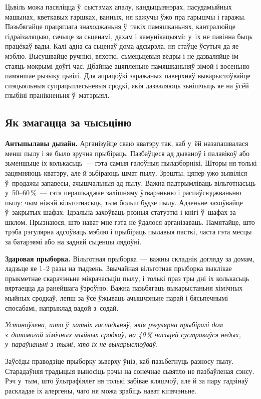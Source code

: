 Цьвіль можа пасяліцца ў~сыстэмах апалу, кандыцыянэрах, пасудамыйных машынах, кветкавых гаршках, ванных, ня кажучы ўжо пра гарышчы і гаражы. Пазьбягайце працяглага знаходжаньня ў~такіх памяшканьнях, кантралюйце гідраізаляцыю, сачыце за сьценамі, дахам і камунікацыямі: у~іх не павінна быць працёкаў вады. Калі адна са сьценаў дома адсырэла, ня стаўце ўсутыч да яе мэблю. Высушвайце ручнікі, вяхоткі, сьмецьцевыя вёдры і не дазваляйце ім стаяць мокрымі доўгі час. Дбайнае ацяпленьне памяшканьняў зімой і восеньню памяншае рызыку цьвілі. Для апрацоўкі заражаных паверхняў выкарыстоўвайце спэцыяльныя супрацьплесьневыя сродкі, якія дазваляюць зьнішчыць яе на ўсёй глыбіні пранікненьня ў~матэрыял.

\subsection*{Як змагацца за чысьціню}

\textbf{Антыпылавы дызайн.} Арганізуйце сваю кватэру так, каб у~ёй назапашвалася менш пылу і яе было зручна прыбіраць. Пазбаўцеся ад дываноў і палавікоў або зьменшыце іх колькасьць~--- гэта самыя галоўныя пылазборнікі. Шторы ня толькі зацямняюць кватэру, але й зьбіраюць шмат пылу. Зрэшты, цяпер ужо зьявіліся ў~продажы запавесы, ачышчальныя ад пылу. Важна падтрымліваць вільготнасьць у~50--60\,\%~--- гэта перашкаджае залішняму ўтварэньню і распаўсюджваньню пылу: чым ніжэй вільготнасьць, тым больш будзе пылу. Адзеньне захоўвайце ў~закрытых шафах. Ідэальна захоўваць розныя статуэткі і кнігі ў~шафах за шклом. Прызнаюся, што нават мне гэта не ўдалося арганізаваць. Памятайце, што трэба рэгулярна адсоўваць мэблю і прыбіраць пылавыя пасткі, часта гэта месцы за батарэямі або на задняй сьценцы лядоўні.

\textbf{Здаровая прыборка.} Вільготная прыборка~--- важны складнік догляду за домам, ладзьце яе 1--2 разы на тыдзень. Звычайная вільготная прыборка выклікае прыкметнае скарачэньне мікрачасьціц пылу, і толькі праз тры дні іх колькасьць вяртаецца да ранейшага ўзроўню. Важна пазьбягаць выкарыстаньня хімічных мыйных сродкаў, лепш за ўсё ўжываць ачышчэньне парай і бясьпечнымі спосабамі, напрыклад вадой з~содай.

\emph{Устаноўлена, што ў~хатніх гаспадыняў, якія рэгулярна прыбіралі дом з~дапамогай хімічных мыйных сродкаў, на 40\,\% часьцей сустракаўся недых, у~параўнаньні з~тымі, хто іх не выкарыстоўваў.}

Заўсёды праводзіце прыборку зьверху ўніз, каб пазьбегнуць разносу пылу. Старадаўняя традыцыя выносіць рэчы на сонечнае сьвятло не пазбаўленая сэнсу. Рэч у~тым, што ўльтрафіялет ня толькі забівае кляшчоў, але й за пару гадзінаў раскладае іх алергены, чаго ня можа зрабіць нават кіпячэньне.

